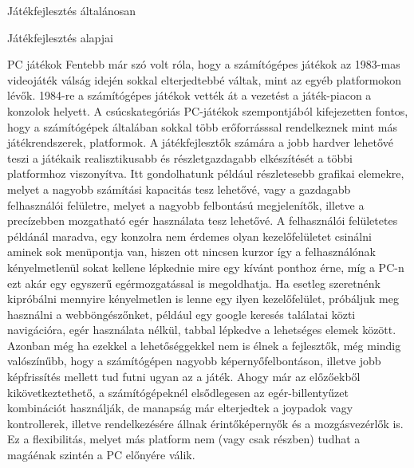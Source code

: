 \begin{MyChapter}{Játékfejlesztés általánosan}
\begin{MySection}{Játékfejlesztés alapjai}
		\begin{MySubSection}{PC játékok}
			Fentebb már szó volt róla, hogy a számítógépes játékok az 1983-mas videojáték válság idején sokkal elterjedtebbé váltak, mint az egyéb platformokon lévők. 1984-re a számítógépes játékok vették át a vezetést a játék-piacon a konzolok helyett.
			A csúcskategóriás PC-játékok szempontjából kifejezetten fontos, hogy a számítógépek általában sokkal több erőforrásssal rendelkeznek mint más játékrendszerek, platformok. A játékfejlesztők számára a jobb hardver lehetővé teszi a játékaik realisztikusabb és részletgazdagabb elkészítését a többi platformhoz viszonyítva. Itt gondolhatunk például részletesebb grafikai elemekre, melyet a nagyobb számítási kapacitás tesz lehetővé, vagy a gazdagabb felhasználói felületre, melyet a nagyobb felbontású megjelenítők, illetve a precízebben mozgatható egér használata tesz lehetővé. A felhasználói felületetes példánál maradva, egy konzolra nem érdemes olyan kezelőfelületet csinálni aminek sok menüpontja van, hiszen ott nincsen kurzor így a felhasználónak kényelmetlenül sokat kellene lépkednie mire egy kívánt ponthoz érne, míg a PC-n ezt akár egy egyszerű egérmozgatással is megoldhatja.
			Ha esetleg szeretnénk kipróbálni mennyire kényelmetlen is lenne egy ilyen kezelőfelület, próbáljuk meg használni a webböngészőnket, például egy google keresés találatai közti navigációra, egér használata nélkül, tabbal lépkedve a lehetséges elemek között.
			Azonban még ha ezekkel a lehetőséggekkel nem is élnek a fejlesztők, még mindig valószínűbb, hogy a számítógépen nagyobb képernyőfelbontáson, illetve jobb képfrissítés mellett tud futni ugyan az a játék.
			Ahogy már az előzőekből kikövetkeztethető, a számítógépeknél elsődlegesen az egér-billentyűzet kombinációt használják, de manapság már elterjedtek a joypadok vagy kontrollerek, illetve rendelkezésére állnak érintőképernyők és a mozgásvezérlők is. Ez a flexibilitás, melyet más platform nem (vagy csak részben) tudhat a magáénak szintén a PC előnyére válik. 
		\end{MySubSection}
	
		

\end{MySection}
\end{MyChapter}

